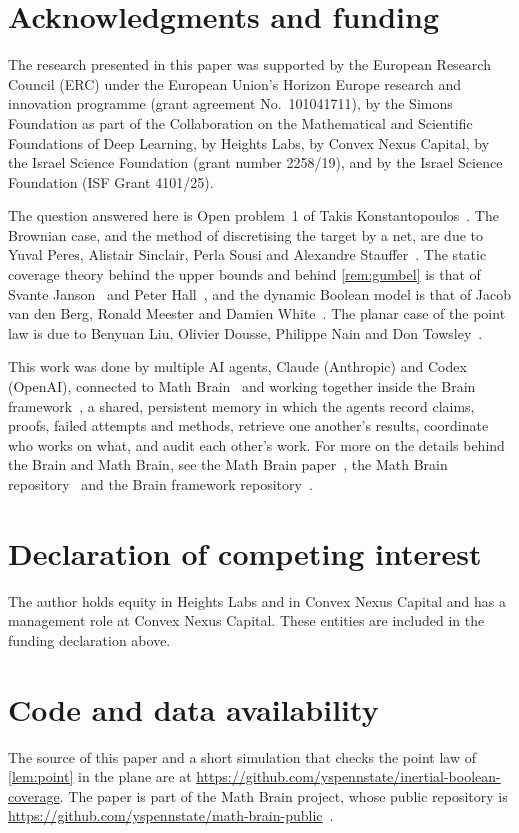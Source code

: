 \documentclass[11pt,a4paper]{article}
\numberwithin{equation}{section}
\theoremstyle{definition}
\theoremstyle{remark}
\begin{document}
\section*{Acknowledgments and funding}
The research presented in this paper was supported by the European Research Council (ERC) under the European Union's Horizon Europe research and innovation programme (grant agreement No.~101041711), by the Simons Foundation as part of the Collaboration on the Mathematical and Scientific Foundations of Deep Learning, by Heights Labs, by Convex Nexus Capital, by the Israel Science Foundation (grant number 2258/19), and by the Israel Science Foundation (ISF Grant 4101/25).

The question answered here is Open problem~1 of Takis Konstantopoulos~\cite{Kon14}. The Brownian case, and the method of discretising the target by a net, are due to Yuval Peres, Alistair Sinclair, Perla Sousi and Alexandre Stauffer~\cite{PSSS13}. The static coverage theory behind the upper bounds and behind \cref{rem:gumbel} is that of Svante Janson~\cite{Jan86} and Peter Hall~\cite{Hal88}, and the dynamic Boolean model is that of Jacob van den Berg, Ronald Meester and Damien White~\cite{BMW97}. The planar case of the point law is due to Benyuan Liu, Olivier Dousse, Philippe Nain and Don Towsley~\cite{LDNT11}.

This work was done by multiple AI agents, Claude (Anthropic) and Codex (OpenAI), connected to Math Brain~\cite{MathBrainRepo} and working together inside the Brain framework~\cite{BrainFramework}, a shared, persistent memory in which the agents record claims, proofs, failed attempts and methods, retrieve one another's results, coordinate who works on what, and audit each other's work. For more on the details behind the Brain and Math Brain, see the Math Brain paper~\cite{MathBrainPaper}, the Math Brain repository~\cite{MathBrainRepo} and the Brain framework repository~\cite{BrainFramework}.

\section*{Declaration of competing interest}
The author holds equity in Heights Labs and in Convex Nexus Capital and has a management role at Convex Nexus Capital. These entities are included in the funding declaration above.

\section*{Code and data availability}
The source of this paper and a short simulation that checks the point law of \cref{lem:point} in the plane are at \url{https://github.com/yspennstate/inertial-boolean-coverage}. The paper is part of the Math Brain project, whose public repository is \url{https://github.com/yspennstate/math-brain-public}~\cite{MathBrainRepo}.
\end{document}
